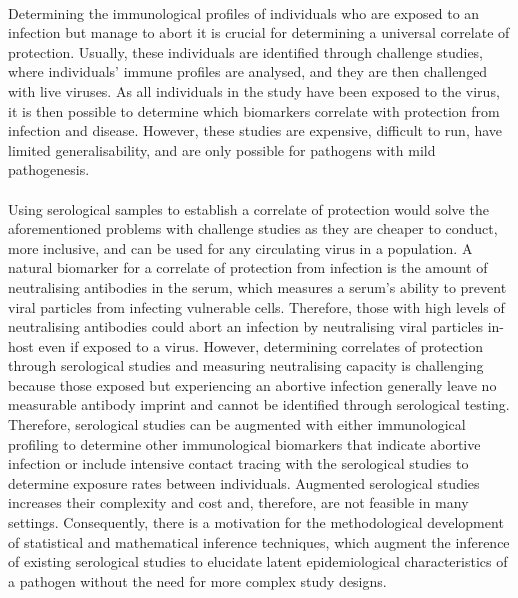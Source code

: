 \paragraph{}Determining the immunological profiles of individuals who are exposed to an infection but manage to abort it is crucial for determining a universal correlate of protection. Usually, these individuals are identified through challenge studies, where individuals' immune profiles are analysed, and they are then challenged with live viruses.\cite{Deming2020-rz} As all individuals in the study have been exposed to the virus, it is then possible to determine which biomarkers correlate with protection from infection and disease. However, these studies are expensive, difficult to run, have limited generalisability, and are only possible for pathogens with mild pathogenesis.\cite{Sekhar2020-ux} 

\paragraph{}Using serological samples to establish a correlate of protection would solve the aforementioned problems with challenge studies as they are cheaper to conduct, more inclusive, and can be used for any circulating virus in a population. A natural biomarker for a correlate of protection from infection is the amount of neutralising antibodies in the serum, which measures a serum's ability to prevent viral particles from infecting vulnerable cells. Therefore, those with high levels of neutralising antibodies could abort an infection by neutralising viral particles in-host even if exposed to a virus. However, determining correlates of protection through serological studies and measuring neutralising capacity is challenging because those exposed but experiencing an abortive infection generally leave no measurable antibody imprint and cannot be identified through serological testing.\cite{Swadling2023-ud}  Therefore, serological studies can be augmented with either immunological profiling to determine other immunological biomarkers that indicate abortive infection\cite{Swadling2022-yv} or include intensive contact tracing with the serological studies to determine exposure rates between individuals.\cite{Cohen2022-sy} Augmented serological studies increases their complexity and cost and, therefore, are not feasible in many settings. Consequently, there is a motivation for the methodological development of statistical and mathematical inference techniques, which augment the inference of existing serological studies to elucidate latent epidemiological characteristics of a pathogen without the need for more complex study designs.\cite{Schiffer2022-xw}

